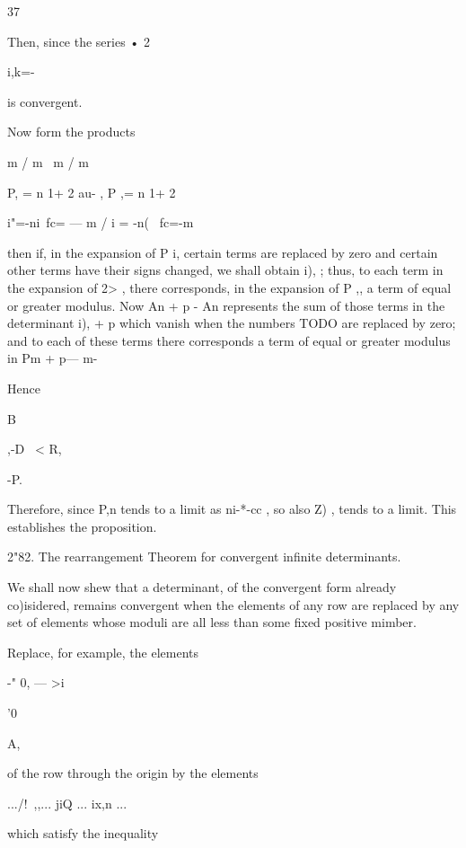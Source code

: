 37




Then, since the series • 2

i,k=-



is convergent.

Now form the products

m / m \ m / m

P, = n 1+ 2 au- , P ,= n 1+ 2

i"=-ni\ fc= — m / i = -n( \ fc=-m

then if, in the expansion of P i, certain terms are replaced by zero
and certain other terms have their signs changed, we shall obtain i),
; thus, to each term in the expansion of 2> , there corresponds, in
the expansion of P ,, a term of equal or greater modulus. Now An + p -
An represents the sum of those terms in the determinant i), + p which
vanish when the numbers TODO are replaced by zero; and to each of
these terms there corresponds a term of equal or greater modulus in Pm
+ p— m-



Hence



B



,-D \ < R,



-P.



Therefore, since P,n tends to a limit as ni-*-cc , so also Z) , tends
to a limit. This establishes the proposition.

2"82. The rearrangement Theorem for convergent infinite determinants.

We shall now shew that a determinant, of the convergent form already
co)isidered, remains convergent when the elements of any row are
replaced by any set of elements whose moduli are all less than some
fixed positive mimber.

Replace, for example, the elements



-" 0, — >i



'0



A,



of the row through the origin by the elements

.../!\ ,,... jiQ ... ix,n ...

which satisfy the inequality


